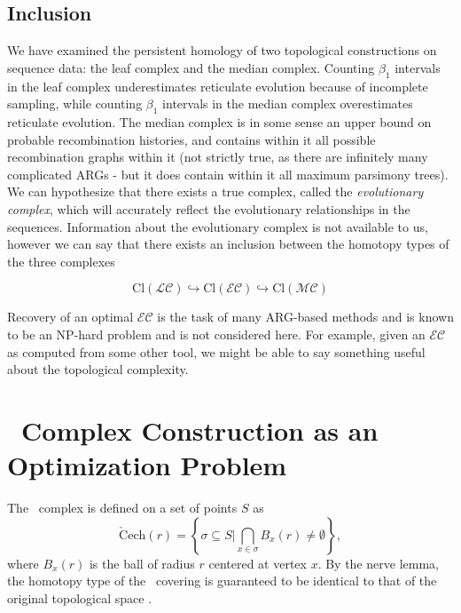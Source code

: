 \subsection{Inclusion}
%
We have examined the persistent homology of two topological constructions on sequence data: the leaf complex and the median complex.
Counting $\beta_1$ intervals in the leaf complex underestimates reticulate evolution because of incomplete sampling, while counting $\beta_1$ intervals in the median complex overestimates reticulate evolution.
The median complex is in some sense an upper bound on probable recombination histories, and contains within it all possible recombination graphs within it (not strictly true, as there are infinitely many complicated ARGs - but it does contain within it all maximum parsimony trees).
We can hypothesize that there exists a true complex, called the \emph{evolutionary complex}, which will accurately reflect the evolutionary relationships in the sequences.
Information about the evolutionary complex is not available to us, however we can say that there exists an inclusion between the homotopy types of the three complexes

\begin{equation}
 \mathrm{Cl}(\mathcal{LC}) \hookrightarrow \mathrm{Cl}(\mathcal{EC}) \hookrightarrow \mathrm{Cl}(\mathcal{MC})
\end{equation}

Recovery of an optimal $\mathcal{EC}$ is the task of many ARG-based methods and is known to be an NP-hard problem and is not considered here.
For example, given an $\mathcal{EC}$ as computed from some other tool, we might be able to say something useful about the topological complexity.

\section{\Cech\ Complex Construction as an Optimization Problem}
\label{subsec:cech_complex}
%
The \Cech\ complex is defined on a set of points $S$ as
\begin{equation}
\mathrm{\check{C}ech}(r) = \left\{\sigma \subseteq S | \bigcap_{x\in\sigma} B_x(r) \neq \emptyset \right\},
\end{equation}
where $B_x(r)$ is the ball of radius $r$ centered at vertex $x$.
By the nerve lemma, the homotopy type of the \Cech\ covering is guaranteed to be identical to that of the original topological space \citep{Borsuk:1948}.

